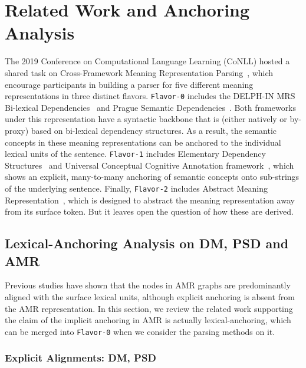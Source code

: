 \section{Related Work and Anchoring Analysis}
\label{sec:lex-phr:anchor-analysis}

The 2019 Conference on Computational Language Learning (CoNLL) hosted
a shared task on Cross-Framework Meaning Representation
Parsing~\cite[MRP 2019,][]{Oep:Abe:Haj:19}, which encourage
participants in building a parser for five different meaning
representations in three distinct flavors. \texttt{Flavor-0} includes
the DELPH-IN MRS Bi-lexical Dependencies~\cite[DM,][]{ivanova2012did}
and Prague Semantic
Dependencies~\cite[PSD,][]{hajic2012announcing,miyao2014house}. Both
frameworks under this representation have a syntactic backbone that is
(either natively or by-proxy) based on bi-lexical dependency
structures. As a result, the semantic concepts in these meaning
representations can be anchored to the individual lexical units of the
sentence. \texttt{Flavor-1} includes Elementary Dependency
Structures~\cite[EDS,][]{oepen2006discriminant} and Universal
Conceptual Cognitive Annotation
framework~\cite[UCCA,][]{abend2013universal}, which shows an explicit,
many-to-many anchoring of semantic concepts onto sub-strings of the
underlying sentence. Finally, \texttt{Flavor-2} includes Abstract
Meaning Representation~\cite[AMR,][]{Banarescu:LWPjKI7N}, which is
designed to abstract the meaning representation away from its surface
token. But it leaves open the question of how these are derived.

\subsection{Lexical-Anchoring Analysis on DM, PSD and AMR}
\label{ssec:lex-phr:lex-anchoring-analysis}
Previous studies have shown that the nodes in AMR graphs are
predominantly aligned with the surface lexical units, although
explicit anchoring is absent from the AMR representation.  In this
section, we review the related work supporting the claim of the
implicit anchoring in AMR is actually lexical-anchoring, which can be
merged into \texttt{Flavor-0} when we consider the parsing methods on
it.

\subsubsection{Explicit Alignments: DM, PSD}
\label{sssec:lex-phr:bi-lexical-anchor}


